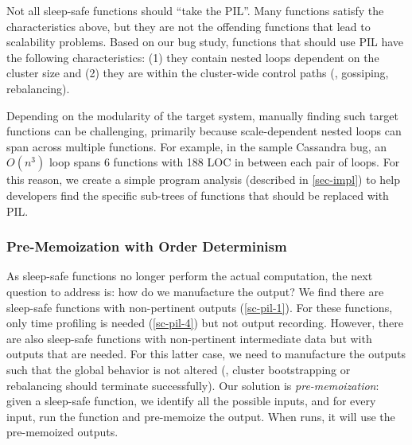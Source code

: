 Not all sleep-safe functions should ``take the PIL''.  Many functions
satisfy the characteristics above, but they are not the offending
functions that lead to scalability problems.  Based on our bug study,
functions that should use PIL have the following  characteristics:
%
(1) they contain nested loops dependent on the cluster
size
%
and (2) they are within the cluster-wide control paths (\eg, gossiping,
rebalancing).


Depending on the modularity of the target system, manually finding such target
functions can be challenging, primarily because scale-dependent nested loops can
span across multiple functions.  For example, in the sample Cassandra bug, an
$O(n^3)$ loop spans 6 functions with 188 LOC in between each pair of loops.  For
this reason, we create a simple program analysis \prx (described in
\sec\ref{sec-impl}) to help developers find the specific sub-trees of functions
that should be replaced with PIL.


\subsubsection{Pre-Memoization with Order Determinism}
\label{sc-pil-3}


As sleep-safe functions no longer perform the actual computation, the next
question to address is: how do we manufacture the output?  We find there
are sleep-safe functions with non-pertinent outputs
(\sec\ref{sc-pil-1}). For these functions, only time profiling is needed
(\sec\ref{sc-pil-4}) but not output recording.  However, there are also
sleep-safe functions with non-pertinent intermediate data but with outputs
that are needed.
%
For this latter case, we need to manufacture the outputs such that the
global behavior is not altered (\eg, cluster bootstrapping or rebalancing
should terminate successfully).
%
Our solution is {\em pre-memoization}: given a sleep-safe
function, we identify all the possible inputs, and for every input, run
the function and pre-memoize the output.  
When \sck runs, it will use the pre-memoized outputs.


